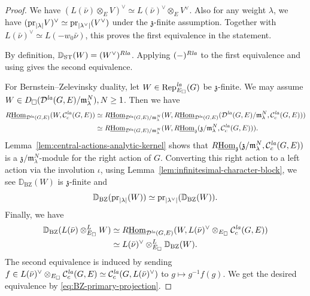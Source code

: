 \documentclass[a4paper,10pt]{amsart}
\theoremstyle{remark}
\theoremstyle{definition}
\theoremstyle{plain}
\numberwithin{equation}{section}
\newcommand{\bbD}{{\mathbb D}}
\renewcommand{\frm}{{\mathfrak m}}
\newcommand{\frz}{{\mathfrak z}}
\newcommand{\calC}{{\mathcal C}}
\newcommand{\calD}{{\mathcal D}}
\newcommand{\Hom}{{\rm Hom}}
\newcommand{\uHom}{\underline{\Hom}}
\newcommand{\la}{{\it la}}
\newcommand{\pr}{{\rm pr}}
\newcommand{\Rep}{{\rm Rep}}
\newcommand{\ST}{{\rm ST}}
\newcommand{\BZ}{\ensuremath{\mathrm{BZ}}}
\begin{document}
\begin{proof}
We have $(L(\bar\nu)\otimes_E V)^\vee \simeq L(\bar\nu)^\vee\otimes_E V^\vee$. Also for any weight $\lambda$, we have $(\pr_{|\lambda|}V)^\vee\simeq \pr_{|\lambda^\vee|}(V^\vee)$ under the $\frz$-finite assumption. Together with $L(\bar\nu)^\vee\simeq L(-w_0\bar\nu)$, this proves the first equivalence in the statement.

By definition, $\bbD_{\ST}(W)=(W^\vee)^{R\la}$. Applying $(-)^{R\la}$ to the first equivalence and using \cite[Cor.~3.2.14(3)]{JC23} gives the second equivalence.

For Bernstein--Zelevinsky duality, let $W\in\Rep^{\la}_{E_\square}(G)$ be $\frz$-finite. We may assume $W\in D_{\square}(\calD^{\la}(G,E)/\frm_{\lambda}^{N}),N\geq 1$. Then we have 
\begin{align*}
	R\uHom_{\calD^{\la}(G,E)}(W,\calC_c^{\la}(G,E))&\simeq R\uHom_{\calD^{\la}(G,E)/\frm_{\lambda}^N}(W,R\uHom_{\calD^{\la}(G,E)}(\calD^{\la}(G,E)/\frm_{\lambda}^N,\calC_c^{\la}(G,E)))\\
	&\simeq R\uHom_{\calD^{\la}(G,E)/\frm_{\lambda}^N}(W,R\uHom_{\frz}(\frz/\frm_{\lambda}^N,\calC_c^{\la}(G,E))).
\end{align*}
Lemma~\ref{lem:central-actions-analytic-kernel} shows that $R\uHom_{\frz}(\frz/\frm_{\lambda}^N,\calC_c^{\la}(G,E))$ is a $\frz/\frm_{\lambda}^N$-module for the right action of $G$. Converting this right action to a left action via the involution $\iota$, using Lemma~\ref{lem:infinitesimal-character-block}, we see $\bbD_{\BZ}(W)$ is $\frz$-finite and 
\begin{equation}\label{eq:BZ-primary-projection}
 \bbD_{\BZ}(\pr_{|\lambda|}(W))
 \simeq\pr_{|\lambda^\vee|}(\bbD_{\BZ}(W)).
\end{equation}
Finally, we have
\begin{equation}\label{eq:BZ-algebraic-tensor}
\begin{aligned}
 \bbD_{\BZ}(L(\bar\nu)\otimes^L_{E_\square}W)&\simeq
 R\uHom_{\calD^{\la}(G,E)}
 (W,L(\bar\nu)^\vee\otimes_{E_\square}\calC_c^{\la}(G,E))\\
 &\simeq L(\bar\nu)^\vee\otimes^L_{E_\square}\bbD_{\BZ}(W).
\end{aligned}
\end{equation}
The second equivalence is induced by sending $f\in L(\bar\nu)^\vee\otimes_{E_\square}\calC_c^{\la}(G,E)\simeq \calC_c^{\la}(G,L(\bar\nu)^\vee)$ to $g\mapsto g^{-1}f(g)$. We get the desired equivalence by \eqref{eq:BZ-primary-projection}.
\end{proof}
\end{document}

